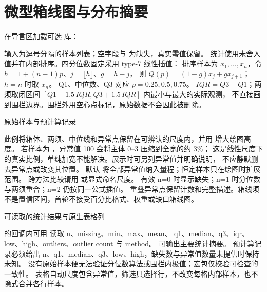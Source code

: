 \section{微型箱线图与分布摘要}
在导言区加载可选  库：
\begin{codeonly}
\end{codeonly}
输入为逗号分隔的样本列表；空字段与  为缺失，真实零值保留。
统计使用未舍入值并在内部排序。四分位数固定采用 type-7 线性插值：
排序样本为 $x_1,\ldots,x_n$，令 $h=1+(n-1)p$、$j=\lfloor h\rfloor$、$g=h-j$，
则 $Q(p)=(1-g)x_j+gx_{j+1}$；$h=n$ 时取 $x_n$。
Q1、中位数、Q3 对应 $p=0.25,0.5,0.75$。
$IQR=Q3-Q1$；两须取闭区间 $[Q1-1.5\,IQR,Q3+1.5\,IQR]$ 内最小与最大的实际观测，
不直接画到围栏边界。围栏外用空心点标记，原始数据不会因此被删除。
\begin{example}[text and listing,sidebyside=false]{原始样本与预计算记录}
\quad
{}
\end{example}
此例将箱体、两须、中位线和异常点保留在可辨认的尺度内，并用  增大绘图高度。
若样本为 ，异常值 100 会将主体 0--3 压缩到全宽的约 3\%；
这是线性尺度下的真实比例，单纯加宽不能解决。展示时可另列异常值并明确说明，
不应静默删去异常点或改变其位置。
默认  将全部异常值纳入量程；恒定样本只在绘图时扩展范围。
跨方法比较请用  或显式命名尺度。
有效 n=0 时显示缺失；n=1 时分位数与两须重合；n=2 仍按同一公式插值。
重叠异常点保留计数和完整描述。箱线须不是置信区间，首轮不接受百分比格式、权重或缺口箱线图。
\begin{example}[text and listing,sidebyside=false]{可读取的统计结果与原生表格列}
\par\medskip
\begin{center}
\begin{gradtable}[align=c,header align=c,style=distribution,width=\linewidth,scale=column]
\end{gradtable}
\end{center}
\end{example}
\key{\gradcomputesummary} 的回调内可用 \key{\gradstat} 读取 n、missing、min、max、mean、
q1、median、q3、iqr、low、high、outliers、outlier count 与 method。
\key{\gradsummarytext} 可输出主要统计摘要。
预计算记录必须给出 n、q1、median、q3、low、high，缺失数与异常值数量未提供时保持未知。
没有原始样本便无法验证分位数算法或围栏内极值；宏包仅校验可检查的一致性。
表格自动尺度包含异常值，筛选只选择行，不改变每格内部样本，也不隐式合并各行样本。
